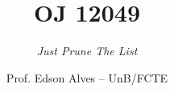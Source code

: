 \title{OJ 12049}
\subtitle{\textit{Just Prune The List}}
\author{Prof. Edson Alves -- UnB/FCTE}
\date{}
